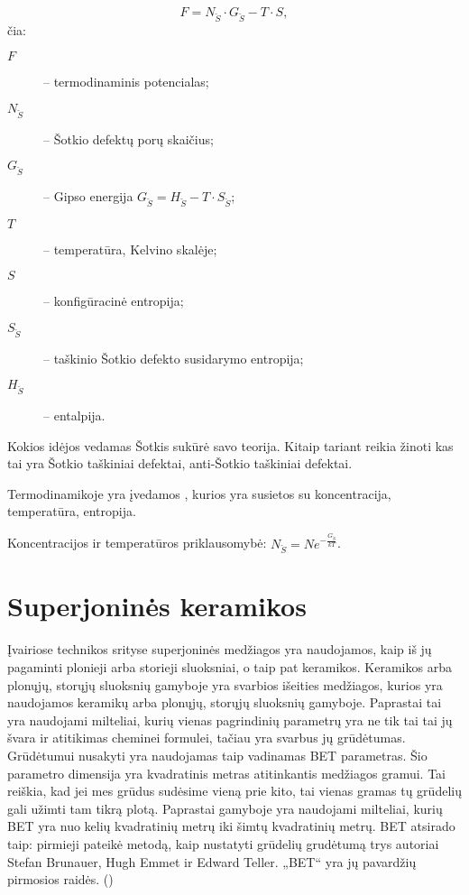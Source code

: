 \begin{equation*}
  F = N_\check{S} \cdot G_\check{S} - T \cdot S,
\end{equation*}
čia:
\begin{description}
  \item[$F$] – termodinaminis potencialas;
  \item[$N_\check{S}$] – Šotkio defektų porų skaičius;
  \item[$G_\check{S}$] – Gipso energija
    $G_\check{S} = H_\check{S} - T \cdot S_\check{S}$;
  \item[$T$] – temperatūra, Kelvino skalėje;
  \item[$S$] – konfigūracinė entropija;
  \item[$S_\check{S}$] – taškinio Šotkio defekto susidarymo entropija;
  \item[$H_\check{S}$] – entalpija.
\end{description}
 
\begin{remember}
  \item Kokios idėjos vedamas Šotkis sukūrė savo teorija. Kitaip tariant
    reikia žinoti kas tai yra Šotkio taškiniai defektai, anti-Šotkio
    taškiniai defektai.
  \item Termodinamikoje yra įvedamos , kurios yra susietos
    su koncentracija, temperatūra, entropija.
  \item Koncentracijos ir temperatūros priklausomybė:
    $N_{\check{S}} = N e^{-\frac{G_{\check{S}}}{kT}}$.
\end{remember}

\section{Superjoninės keramikos}

Įvairiose technikos srityse superjoninės medžiagos yra naudojamos,
kaip iš jų pagaminti plonieji arba storieji sluoksniai, o taip
pat keramikos. Keramikos arba plonųjų, storųjų sluoksnių gamyboje
yra svarbios išeities medžiagos, kurios yra naudojamos keramikų
arba plonųjų, storųjų sluoksnių gamyboje. Paprastai tai yra naudojami
milteliai, kurių vienas pagrindinių parametrų yra ne tik tai tai
jų švara ir atitikimas cheminei formulei, tačiau yra svarbus
jų grūdėtumas. Grūdėtumui nusakyti yra naudojamas taip vadinamas
BET parametras. Šio parametro dimensija yra kvadratinis metras
atitinkantis medžiagos gramui. Tai reiškia, kad jei mes grūdus
sudėsime vieną prie kito, tai vienas gramas tų grūdelių gali
užimti tam tikrą plotą. Paprastai gamyboje yra naudojami milteliai,
kurių BET yra nuo kelių kvadratinių metrų iki šimtų kvadratinių
metrų. BET atsirado taip: pirmieji pateikė metodą, kaip nustatyti
grūdelių grudėtumą trys autoriai Stefan Brunauer, Hugh Emmet ir
Edward Teller. „BET“ yra jų pavardžių pirmosios raidės. ()

